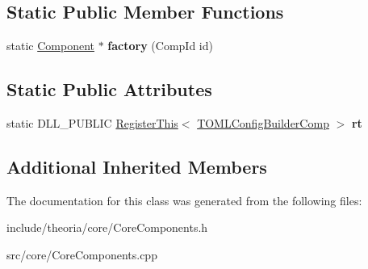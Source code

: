 \subsection*{Static Public Member Functions}
\begin{DoxyCompactItemize}
\item 
\mbox{\label{classtheoria_1_1core_1_1TOMLConfigBuilderComp_abb82664199a9549fddb64bc442a5ddfa}} 
static \hyperlink{classtheoria_1_1core_1_1Component}{Component} $\ast$ {\bfseries factory} (Comp\+Id id)
\end{DoxyCompactItemize}
\subsection*{Static Public Attributes}
\begin{DoxyCompactItemize}
\item 
\mbox{\label{classtheoria_1_1core_1_1TOMLConfigBuilderComp_abba84fd2e773b9ab26692c9638a1dcc4}} 
static D\+L\+L\+\_\+\+P\+U\+B\+L\+IC \hyperlink{classtheoria_1_1core_1_1RegisterThis}{Register\+This}$<$ \hyperlink{classtheoria_1_1core_1_1TOMLConfigBuilderComp}{T\+O\+M\+L\+Config\+Builder\+Comp} $>$ {\bfseries rt}
\end{DoxyCompactItemize}
\subsection*{Additional Inherited Members}


The documentation for this class was generated from the following files\+:\begin{DoxyCompactItemize}
\item 
include/theoria/core/Core\+Components.\+h\item 
src/core/Core\+Components.\+cpp\end{DoxyCompactItemize}
